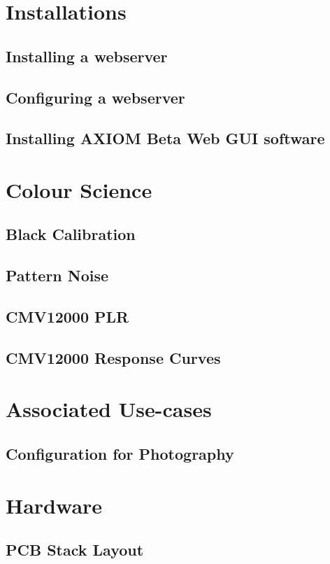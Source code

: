 \documentclass{article}
\begin{document}
\section{Installations}
\subsection{Installing a webserver}
\subsection{Configuring a webserver}
\subsection{Installing AXIOM Beta Web GUI software}

\section{Colour Science}
\subsection{Black Calibration}
\subsection{Pattern Noise}
\subsection{CMV12000 PLR}
\subsection{CMV12000 Response Curves}

\section{Associated Use-cases}
\subsection{Configuration for Photography}

\section{Hardware}
\subsection{PCB Stack Layout}
\end{document}
